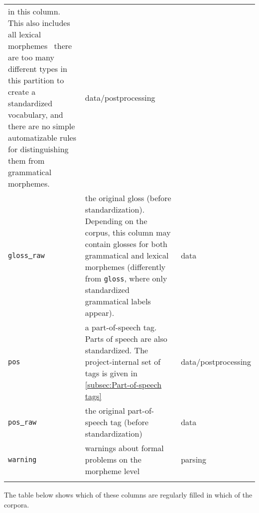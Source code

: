 \documentclass[a4paper, 11pt]{book}
\newcommand{\und}{\underline{{ }}\hspace{0.2mm}}	%
\begin{document}
\begin{longtable}{lp{.5\linewidth}p{.2\linewidth}}
								  in this column. This also includes all lexical morphemes \textendash\ there are too many different types in this partition
								  to create a standardized vocabulary, and there are no simple automatizable rules for distinguishing them from
								  grammatical morphemes. & data/postprocessing \\
		\texttt{gloss\und raw} 	& the original gloss (before standardization). Depending on the corpus, this column may contain glosses for both
			 					  grammatical and lexical morphemes (differently from \texttt{gloss}, where only standardized grammatical labels appear). & data \\
		\texttt{pos} 			& a part-of-speech tag. Parts of speech are also standardized. The project-internal set of tags is given in
			 					  \autoref{subsec:Part-of-speech tags} & data/postprocessing \\
		
		\texttt{pos\und raw} 	& the original part-of-speech tag (before standardization) & data \\
		\texttt{warning}		& warnings about formal problems on the morpheme level & parsing \\[-0.3cm]

	\label{tab:Table morphemes}
\end{longtable}

The table below shows which of these columns are regularly filled in which of the corpora. 
\end{document}
